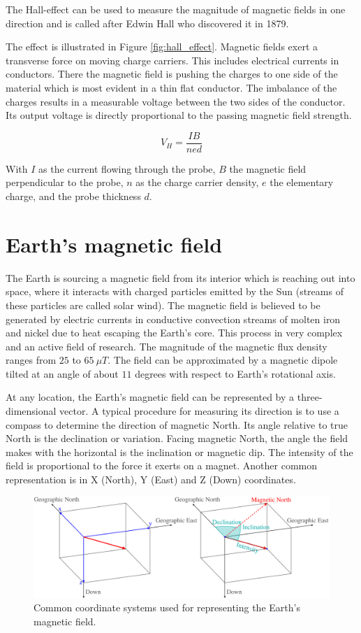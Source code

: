 The Hall-effect can be used to measure the magnitude of magnetic fields in one direction and is called after Edwin Hall who discovered it in 1879.

The effect is illustrated in Figure \ref{fig:hall_effect}. Magnetic fields exert a transverse force on moving charge carriers. This includes electrical currents in conductors. There the magnetic field is pushing the charges to one side of the material which is most evident in a thin flat conductor. The imbalance of the charges results in a measurable voltage between the two sides of the conductor. Its output voltage is directly proportional to the passing magnetic field strength.

\[V_H = \frac{I B}{n e d}\]

With $I$ as the current flowing through the probe, $B$ the magnetic field perpendicular to the probe, $n$ as the charge carrier density, $e$ the elementary charge, and the probe thickness $d$.

\section{Earth's magnetic field}

The Earth is sourcing a magnetic field from its interior which is reaching out into space, where it interacts with charged particles emitted by the Sun (streams of these particles are called solar wind). The magnetic field is believed to be generated by electric currents in conductive convection streams of molten iron and nickel due to heat escaping the Earth's core. This process in very complex and an active field of research. The magnitude of the magnetic flux density ranges from $25$ to $65\ \mu T$. The field can be approximated by a magnetic dipole tilted at an angle of about $11$ degrees with respect to Earth's rotational axis.

At any location, the Earth's magnetic field can be represented by a three-dimensional vector. A typical procedure for measuring its direction is to use a compass to determine the direction of magnetic North. Its angle relative to true North is the declination or variation. Facing magnetic North, the angle the field makes with the horizontal is the inclination or magnetic dip. The intensity of the field is proportional to the force it exerts on a magnet. Another common representation is in X (North), Y (East) and Z (Down) coordinates.\cite{earth_magnetic}

\begin{figure}[hbt!]
    \centering
    \includegraphics[width=1.0\textwidth]{figures/earth_magnetic_field_coords.png}
    \caption{Common coordinate systems used for representing the Earth's magnetic field.}
    \label{fig:earth_magnetic_field_coords}
\end{figure}

